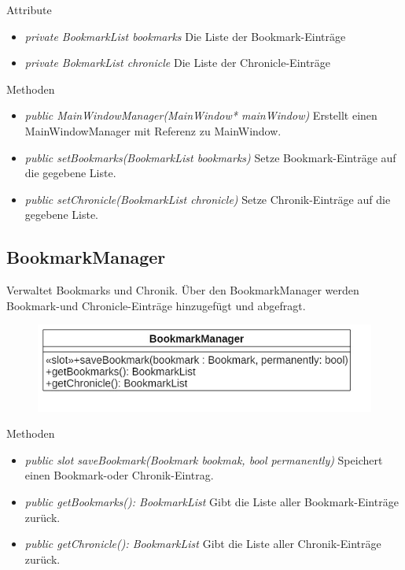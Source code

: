 Attribute
\begin{itemize}
	\item\textit{private BookmarkList bookmarks}
	Die Liste der Bookmark-Einträge
	\item\textit{private BokmarkList chronicle}
	Die Liste der Chronicle-Einträge

\end{itemize}

Methoden
\begin{itemize}
	\item\textit{public MainWindowManager(MainWindow* mainWindow)}
	Erstellt einen MainWindowManager mit Referenz zu MainWindow.
	\item\textit{public setBookmarks(BookmarkList bookmarks)}
	Setze Bookmark-Einträge auf die gegebene Liste.
	\item\textit{public setChronicle(BookmarkList chronicle) }
	Setze Chronik-Einträge auf die gegebene Liste.
\end{itemize}

\subsection*{BookmarkManager}
Verwaltet Bookmarks und Chronik. Über den BookmarkManager werden Bookmark-und Chronicle-Einträge hinzugefügt und abgefragt.

\begin{figure}[H]
\centering
\includegraphics[scale=0.5]{img/Klassendiagramm/Klassen/Controller/BookmarkManager}
\label{fig:bookmarkManager}
\end{figure}

Methoden
\begin{itemize}
	\item\textit{public slot saveBookmark(Bookmark bookmak, bool permanently)}
	Speichert einen Bookmark-oder Chronik-Eintrag.
	\item\textit{public getBookmarks(): BookmarkList}
	Gibt die Liste aller Bookmark-Einträge zurück.
	\item\textit{public getChronicle(): BookmarkList}
	Gibt die Liste aller Chronik-Einträge zurück.
\end{itemize}


